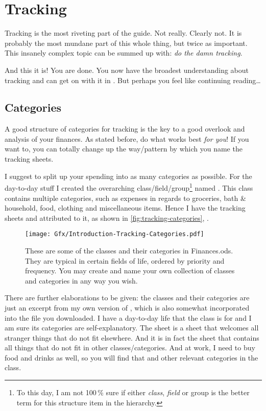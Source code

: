\section{Tracking}
\label{sec:tracking}

Tracking is the most riveting part of the guide.
Not really.
Clearly not.
It is probably the most mundane part of this whole thing, but twice as important.
This insanely complex topic can be summed up with: \emph{do the damn tracking}.

And this it is!
You are done.
You now have the broadest understanding about tracking and can get on with it in \tfn.
But perhaps you feel like continuing reading\ldots

\subsection{Categories}
\label{subsec:tracking-categories}

A good structure of categories for tracking is the key to a good overlook and analysis of your finances.
As stated before, do what works best \emph{for you}!
If you want to, you can totally change up the way/pattern by which you name the tracking sheets.

I suggest to split up your spending into as many categories as possible.
For the day-to-day stuff I created the overarching class/field/group\footnote{To this day, I am not 100\,\% sure if either \emph{class}, \emph{field} or group is the better term for this structure item in the hierarchy.} named .
This class contains multiple categories, such as expenses in regards to groceries, bath \& household, food, clothing and miscellaneous items.
Hence I have the tracking sheets  and  attributed to it, as shown in \autoref{fig:tracking-categories}, .

\begin{figure}[htp]
	\centering
	\texttt{[image: Gfx/Introduction-Tracking-Categories.pdf]}
	\caption[Tracking Categories]{These are some of the classes and their categories in Finances.ods.
	They are typical in certain fields of life, ordered by priority and frequency.
	You may create and name your own collection of classes and categories in any way you wish.%
	}
	\label{fig:tracking-categories}
\end{figure}

There are further elaborations to be given:
the classes and their categories are just an excerpt from my own version of \tfn, which is also somewhat incorporated into the file you downloaded.
I have a day-to-day life that the class  is for and I am sure its categories are self-explanatory.
The sheet  is a sheet that welcomes all stranger things that do not fit elsewhere.
And it is in fact the sheet that contains all  things that do not fit in other classes/categories.
And at work, I need to buy food and drinks as well, so you will find that and other relevant categories in the  class.


